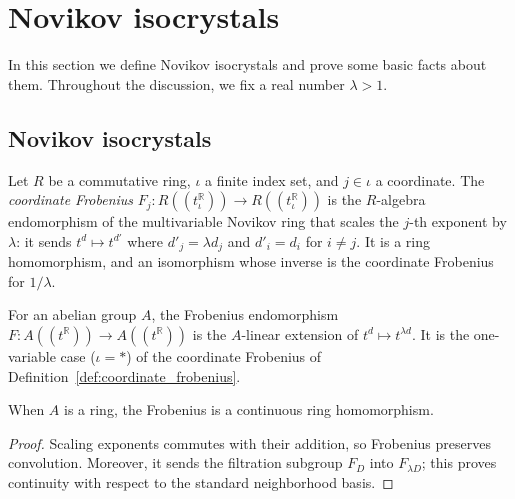 
\section{Novikov isocrystals}
\label{sec:novikov_isocrystals}

In this section we define Novikov isocrystals and prove some basic facts about
them. Throughout the discussion, we fix a real number $\lambda >
1$.

\subsection{Novikov isocrystals}

\begin{definition}
  \label{def:coordinate_frobenius}
  \leanok
  Let $R$ be a commutative ring, $\iota$ a finite index set, and
  $j\in\iota$ a coordinate.  The \emph{coordinate Frobenius}
  $F_j \colon R((t_\iota^{\mathbb{R}})) \to R((t_\iota^{\mathbb{R}}))$ is the
  $R$-algebra endomorphism of the multivariable Novikov ring that scales the
  $j$-th exponent by $\lambda$: it sends $t^d \mapsto t^{d'}$ where
  $d'_j = \lambda d_j$ and $d'_i = d_i$ for $i \neq j$.  It is a ring
  homomorphism, and an isomorphism whose inverse is the coordinate Frobenius for
  $1/\lambda$.
\end{definition}

\begin{definition}
  \label{def:frobenius}
  \leanok
  For an abelian group $A$, the Frobenius endomorphism $F \colon
  A((t^{\mathbb{R}})) \to A((t^{\mathbb{R}}))$ is the $A$-linear extension of
  $t^d \mapsto t^{\lambda d}$.  It is the one-variable case ($\iota = \ast$)
  of the coordinate Frobenius of Definition~\ref{def:coordinate_frobenius}.
\end{definition}

\begin{theorem}
  \label{thm:frobenius_properties}
  \leanok
  When $A$ is a ring, the Frobenius is a continuous ring homomorphism.
\end{theorem}

\begin{proof}
  \leanok
  Scaling exponents commutes with their addition, so Frobenius preserves
  convolution.  Moreover, it sends the filtration subgroup $F_D$ into
  $F_{\lambda D}$; this proves continuity with respect to the standard
  neighborhood basis.
\end{proof}

